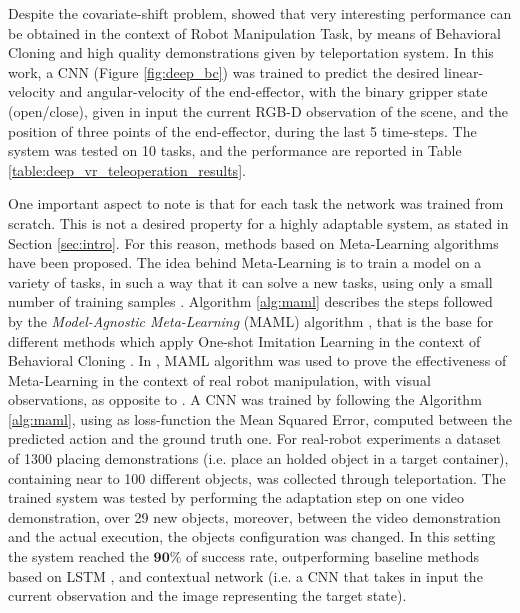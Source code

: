 Despite the covariate-shift problem, \cite{zhang2018deep_vr_teleoperation} showed that very interesting performance can be obtained in the context of Robot Manipulation Task, by means of Behavioral Cloning and high quality demonstrations given by teleportation system. In this work, a CNN (Figure \ref{fig:deep_bc}) was trained to predict the desired linear-velocity and angular-velocity of the end-effector, with the binary gripper state (open/close), given in input the current RGB-D observation of the scene, and the position of three points of the end-effector, during the last 5 time-steps. The system was tested on 10 tasks, and the performance are reported in Table \ref{table:deep_vr_teleoperation_results}.


\newline One important aspect to note is that for each task the network was trained from scratch. This is not a desired property for a highly adaptable system, as stated in Section \ref{sec:intro}. For this reason, methods based on Meta-Learning algorithms have been proposed. The idea behind Meta-Learning is to train a model on a variety of tasks, in such a way that it can solve a new tasks, using only a small number of training samples \cite{finn2017maml}. Algorithm \ref{alg:maml} describes the steps followed by the \textit{Model-Agnostic Meta-Learning} (MAML) algorithm \cite{finn2017maml}, that is the base for different methods which apply One-shot Imitation Learning in the context of Behavioral Cloning \cite{finn2017one_shot_visual_il,yu2018daml,yu2018one_shot_hil}.
\newline In \cite{finn2017one_shot_visual_il}, MAML algorithm was used to prove the effectiveness of Meta-Learning in the context of real robot manipulation, with visual observations, as opposite to \cite{duan2017one_shot_il}. A CNN was trained by following the Algorithm \ref{alg:maml}, using as loss-function the Mean Squared Error, computed between the predicted action and the ground truth one. For real-robot experiments a dataset of 1300 placing demonstrations (i.e. place an holded object in a target container), containing near to 100 different objects, was collected through teleportation. The trained system was tested by performing the adaptation step on one video demonstration, over 29 new objects, moreover, between the video demonstration and the actual execution, the objects configuration was changed. In this setting the system reached the $\mathbf{90\%}$ of success rate, outperforming baseline methods based on LSTM \cite{duan2017one_shot_il}, and contextual network (i.e. a CNN that takes in input the current observation and the image representing the target state).

